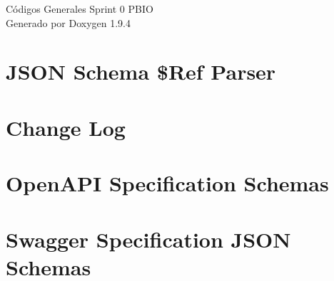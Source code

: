 \documentclass[twoside]{book}
\newcommand{\+}{\discretionary{\mbox{\scriptsize$\hookleftarrow$}}{}{}}
\newcommand{\clearemptydoublepage}{%
    \newpage{\pagestyle{empty}\cleardoublepage}%
  }
\begin{document}
  \raggedbottom
    \hypersetup{pageanchor=false,
                bookmarksnumbered=true,
                pdfencoding=unicode
               }
  \begin{titlepage}
  \vspace*{7cm}
  \begin{center}%
  {\Large Códigos Generales Sprint 0 PBIO}\\
  \vspace*{1cm}
  {\large Generado por Doxygen 1.9.4}\\
  \end{center}
  \end{titlepage}
  \clearemptydoublepage
  \tableofcontents
  \clearemptydoublepage
  \hypersetup{pageanchor=true}
\chapter{JSON Schema \$Ref Parser}
\label{md_Backend_nodejs_node_modules__apidevtools_json_schema_ref_parser_README}

\chapter{Change Log}
\label{md_Backend_nodejs_node_modules__apidevtools_openapi_schemas_CHANGELOG}

\chapter{Open\+API Specification Schemas}
\label{md_Backend_nodejs_node_modules__apidevtools_openapi_schemas_README}

\chapter{Swagger Specification JSON Schemas}
\label{md_Backend_nodejs_node_modules__apidevtools_openapi_schemas_schemas_v1_2_README}

\end{document}
